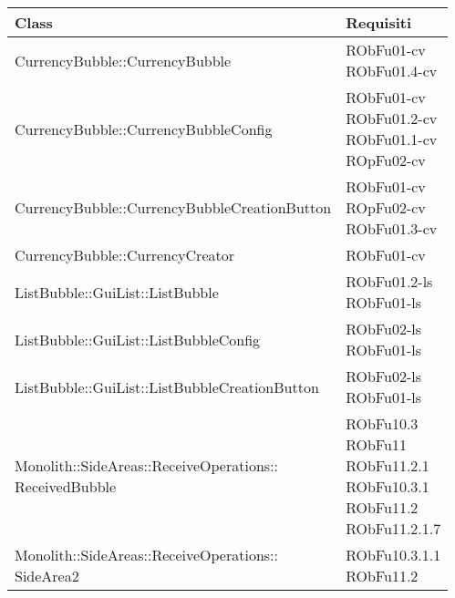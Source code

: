 \begin{center}
\begin{longtable}{|
*{1}{>{\centering\arraybackslash}m{7.5cm}|}
*{1}{>{\centering\arraybackslash}m{2.5cm}|}}
\hline \textbf{Class} & \textbf{Requisiti}\\
\hline \endhead
\hline \endfoot

CurrencyBubble::CurrencyBubble & \makecell{RObFu01-cv
\\RObFu01.4-cv
\\}\\\hline
CurrencyBubble::CurrencyBubbleConfig & \makecell{RObFu01-cv
\\RObFu01.2-cv
\\RObFu01.1-cv
\\ROpFu02-cv
\\}\\\hline
CurrencyBubble::CurrencyBubbleCreationButton & \makecell{RObFu01-cv
\\ROpFu02-cv
\\RObFu01.3-cv
\\}\\\hline
CurrencyBubble::CurrencyCreator & \makecell{RObFu01-cv
\\}\\\hline
ListBubble::GuiList::ListBubble & \makecell{RObFu01.2-ls
\\RObFu01-ls
\\}\\\hline
ListBubble::GuiList::ListBubbleConfig & \makecell{RObFu02-ls
\\RObFu01-ls
\\}\\\hline
ListBubble::GuiList::ListBubbleCreationButton & \makecell{RObFu02-ls
\\RObFu01-ls
\\}\\\hline
\makecell[l]{Monolith::SideAreas::ReceiveOperations:: \\ \hfill ReceivedBubble} & \makecell{RObFu10.3
\\RObFu11
\\RObFu11.2.1
\\RObFu10.3.1
\\RObFu11.2
\\RObFu11.2.1.7
\\}\\\hline
\makecell[l]{Monolith::SideAreas::ReceiveOperations:: \\ \hfill SideArea2} & \makecell{RObFu10.3.1.1
\\RObFu11.2
}
\end{longtable}
\end{center}
